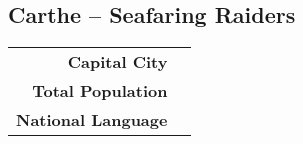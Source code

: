 \subsection{Carthe -- Seafaring Raiders}
\begin{tabular}{r | l}
    \textbf{Capital City} & \\
    \textbf{Total Population} & \\
    \textbf{National Language}
\end{tabular}